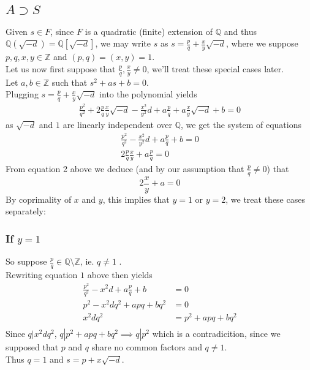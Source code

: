 \documentclass[11pt, a4paper]{article}
\begin{document}
\subsection*{ $ A \supset S$ }
Given $s \in F$, since $F$ is a quadratic (finite) extension of $\mathbb{Q}$ and thus $ \mathbb{Q}\left( \sqrt{-d} \right) = \mathbb{Q} \left[  \sqrt{-d} \right] $, we may write $s $ as $ s= \frac{p}{q} + \frac{x}{y}	 \sqrt{-d} $, where we suppose $ p,q,x,y \in \mathbb{Z}$ and $ ( p,q) = ( x,y) = 1$.\\
Let us now first suppose that $ \frac{p}{q}, \frac{x}{y}\neq 0$, we'll treat these special cases later.\\
Let $a,b \in \mathbb{Z}$ such that $ s^{2}+ as + b = 0$.\\
Plugging $s= \frac{p}{q}+ \frac{x}{y} \sqrt{-d} $ into the polynomial yields
\begin{align*}
\frac{p^{2}}{q^{2}} + 2 \frac{p}{q} \frac{x}{y} \sqrt{-d}  - \frac{x^{2}}{y^{2}}d + a \frac{p}{q} + a \frac{x}{y} \sqrt{-d} + b = 0
\end{align*}
as $ \sqrt{-d} $ and $1$ are linearly independent over $\mathbb{Q}$, we get the system of equations
\begin{align}
\frac{p^{2}}{q^{2}} - \frac{x^{2}}{y^{2}} d + a \frac{p}{q} + b =0\\
 2 \frac{p}{q} \frac{x}{y} + a \frac{p}{q} = 0
\end{align}
From equation 2 above we deduce (and by our assumption that $\frac{p}{q} \neq 0$) that
\[ 
2 \frac{x}{y} + a =0
\]
By coprimality of $x$ and $y$, this implies that $ y =1$ or $y=2$, we treat these cases separately:
\subsubsection*{If $y=1$ }
So suppose $ \frac{p}{q}\in \mathbb{Q}\setminus \mathbb{Z}$, ie. $q \neq 1$ .\\
Rewriting equation $1$ above then yields
\begin{align*}
	\frac{p^{2}}{q^{2}} - x^{2} d + a \frac{p}{q} + b &=0\\
	p^{2} - x^{2} d q^{2} + a p q + b q ^{2} &=0\\
	x^{2}d q^{2} &= p^{2} + a pq + bq^{2}\\
\end{align*}
Since $q| x^{2}dq^{2}$, $ q | p^{2} + apq + bq^{2}\implies q | p^{2} $ which is a contradicition, since we supposed that $p$ and $q$ share no common factors and $q\neq 1$.\\
Thus $q=1$ and $ s = p + x \sqrt{ -d} $.
\end{document}
